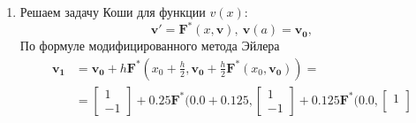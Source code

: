 \documentclass[a4paper, 12pt]{article}
\begin{document}
\begin{enumerate}
\begin{align*}
\begin{bmatrix}
					1.6559
				\end{bmatrix} + 0.125\mathbf{F}\bigg(0.5, 
				\begin{bmatrix}
					1.6432\\
					1.6559
				\end{bmatrix}\bigg)\bigg)=
				\begin{bmatrix}
					2.1085\\
					2.1283
				\end{bmatrix}\\
				\mathbf{u_4}&=\mathbf{u_3} + h\mathbf{F}(x_3 + \frac{h}{2}, \mathbf{u_3}+\frac{h}{2}\mathbf{F}(x_3,\mathbf{u_3}))=\\&=
				\begin{bmatrix}
					2.1085\\
					2.1283
				\end{bmatrix} + 0.25\mathbf{F}\bigg(0.75 + 0.125, 
				\begin{bmatrix}
					2.1085\\
					2.1283
				\end{bmatrix} + 0.125\mathbf{F}\bigg(0.75, 
				\begin{bmatrix}
					2.1085\\
					2.1283
				\end{bmatrix}\bigg)\bigg)=
				\begin{bmatrix}
					2.7064\\
					2.7334
				\end{bmatrix}
			\end{align*}
		\item Решаем задачу Коши для функции $v(x)$:
		\begin{equation*}
			\mathbf{v'}=\mathbf{F^*}(x,\mathbf{v}), \ \mathbf{v}(a)=\mathbf{v_0},
		\end{equation*}
			По формуле модифицированного метода Эйлера
			\begin{align*}
				\mathbf{v_1}&=\mathbf{v_0} + h\mathbf{F^*}(x_0 + \frac{h}{2}, \mathbf{v_0}+\frac{h}{2}\mathbf{F^*}(x_0,\mathbf{v_0}))=\\&=
				\begin{bmatrix}
					1\\
					-1
				\end{bmatrix} + 0.25\mathbf{F^*}\bigg(0.0 + 0.125, 
				\begin{bmatrix}
					1\\
					-1
				\end{bmatrix} + 0.125\mathbf{F^*}\bigg(0.0, 
				\begin{bmatrix}
					1\\

\end{bmatrix}
\end{align*}
\end{enumerate}
\end{document}
